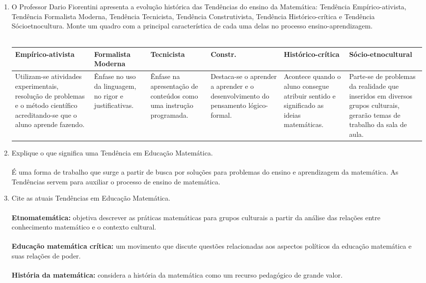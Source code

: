 \documentclass[a4paper, 12pt]{article}
\begin{document}
\begin{enumerate}
\item O Professor Dario Fiorentini apresenta a evolução histórica das Tendências do ensino da Matemática: Tendência Empírico-ativista, Tendência Formalista Moderna, Tendência Tecnicista, Tendência Construtivista, Tendência Histórico-crítica e Tendência Sócioetnocultura. Monte um quadro com a principal característica de cada uma delas no processo ensino-aprendizagem. \\ \\
  \begin{tabular}{ | m{2cm} | m{2cm} | m{2cm} | m{2cm} | m{2cm} | m{2cm} |}
    \textbf{Empírico-ativista} & \textbf{Formalista Moderna} & \textbf{Tecnicista} & \textbf{Constr.} & \textbf{Histórico-crítica} & \textbf{Sócio-etnocultural} \\ \hline
    Utilizam-se atividades experimentais, resolução de problemas e o método científico acreditando-se que o aluno aprende fazendo. &
    Ênfase no uso da linguagem, no rigor e justificativas. &
    Ênfase na apresentação de conteúdos como uma instrução programada. &
    Destaca-se o aprender a aprender e o desenvolvimento do pensamento lógico-formal. &
    Acontece quando o aluno consegue atribuir sentido e significado as ideias matemáticas. &
    Parte-se de problemas da realidade que inseridos em diversos grupos culturais, gerarão temas de trabalho da sala de aula.
  \end{tabular}
\item Explique o que significa uma Tendência em Educação Matemática. \\ \\
  É uma forma de trabalho que surge a partir de busca por soluções para problemas do ensino e aprendizagem da matemática. As Tendências servem para auxiliar o processo de ensino de matemática.
\item Cite as atuais Tendências em Educação Matemática. \\ \\
  \textbf{Etnomatemática:} objetiva descrever as práticas matemáticas para grupos culturais a partir da análise das relações entre conhecimento matemático e o contexto cultural. \\ \\  
  \textbf{Educação matemática crítica:} um movimento que discute questões relacionadas aos aspectos políticos da educação matemática e suas relações de poder. \\ \\
  \textbf{História da matemática:} considera a história da matemática como um recurso pedagógico de grande valor. \\ \\

\end{enumerate}
\end{document}
